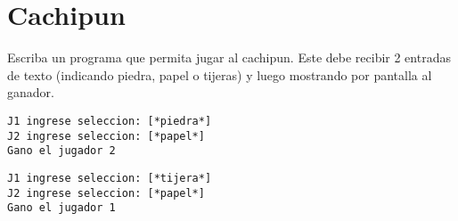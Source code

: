 \section{Cachipun}

Escriba un programa que permita jugar al cachipun. Este debe recibir 2 entradas de texto (indicando piedra, papel o tijeras) y luego mostrando por pantalla al ganador.

\begin{lstlisting}[style=consola]
J1 ingrese seleccion: [*piedra*]
J2 ingrese seleccion: [*papel*]
Gano el jugador 2
\end{lstlisting}

\begin{lstlisting}[style=consola]
J1 ingrese seleccion: [*tijera*]
J2 ingrese seleccion: [*papel*]
Gano el jugador 1
\end{lstlisting}

